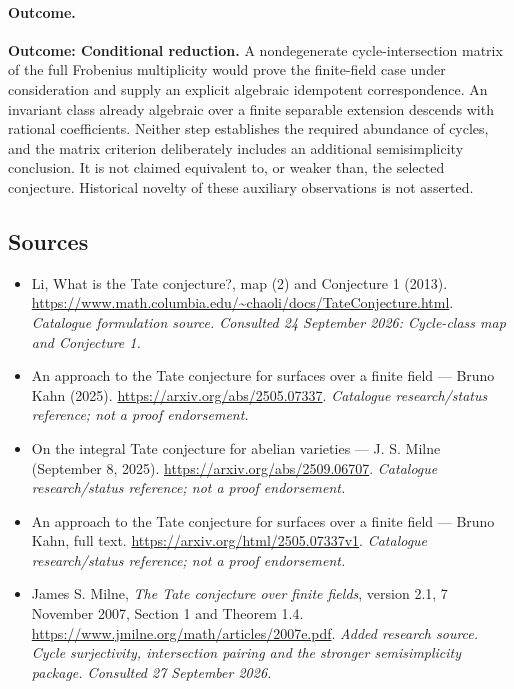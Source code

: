 \documentclass[11pt,a4paper]{article}
\begin{document}
\paragraph{Outcome.}
\textbf{Outcome: Conditional reduction.}
A nondegenerate cycle-intersection matrix of the full Frobenius
multiplicity would prove the finite-field case under consideration and
supply an explicit algebraic idempotent correspondence. An invariant class already
algebraic over a finite separable extension descends with rational
coefficients. Neither step establishes the required abundance of cycles,
and the matrix criterion deliberately includes an additional
semisimplicity conclusion. It is not claimed equivalent to, or weaker
than, the selected conjecture. Historical novelty of these auxiliary
observations is not asserted.
\subsection{Sources}
\begin{itemize}\raggedright
\item[\textnormal{[S1]}]\hypertarget{source:statement:1}{} Li, What is the Tate conjecture?, map (2) and Conjecture 1 (2013).
\url{https://www.math.columbia.edu/~chaoli/docs/TateConjecture.html}.
{\small\textit{Catalogue formulation source. Consulted 24 September 2026: Cycle-class map and Conjecture 1.}}
\item[\textnormal{[S2]}]\hypertarget{source:statement:2}{} An approach to the Tate conjecture for surfaces over a finite field — Bruno Kahn (2025).
\url{https://arxiv.org/abs/2505.07337}.
{\small\textit{Catalogue research/status reference; not a proof endorsement.}}
\item[\textnormal{[S3]}]\hypertarget{source:statement:3}{} On the integral Tate conjecture for abelian varieties — J. S. Milne (September 8, 2025).
\url{https://arxiv.org/abs/2509.06707}.
{\small\textit{Catalogue research/status reference; not a proof endorsement.}}
\item[\textnormal{[S4]}]\hypertarget{source:statement:4}{} An approach to the Tate conjecture for surfaces over a finite field — Bruno Kahn, full text.
\url{https://arxiv.org/html/2505.07337v1}.
{\small\textit{Catalogue research/status reference; not a proof endorsement.}}
\item[\textnormal{[E1]}]\hypertarget{extra:statement:1}{} James S. Milne, \emph{The Tate conjecture over finite fields}, version 2.1, 7 November 2007, Section 1 and Theorem 1.4.
\url{https://www.jmilne.org/math/articles/2007e.pdf}.
{\small\textit{Added research source. Cycle surjectivity, intersection pairing and the stronger semisimplicity package. Consulted 27 September 2026.}}
\end{itemize}

\end{document}
